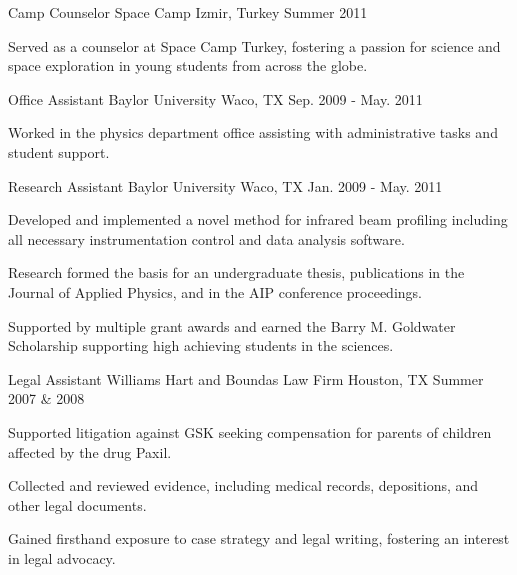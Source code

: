 \begin{cventries}
  \cventry
    {Camp Counselor} %
    {Space Camp} %
    {Izmir, Turkey} %
    {Summer 2011} %
    {
      \begin{cvitems} %
        \item {Served as a counselor at Space Camp Turkey, fostering a passion for science and space exploration in young students from across the globe.}
      \end{cvitems}
    }

  \cventry
    {Office Assistant} %
    {Baylor University} %
    {Waco, TX} %
    {Sep. 2009 - May. 2011} %
    {
      \begin{cvitems} %
        \item {Worked in the physics department office assisting with administrative tasks and student support.}
      \end{cvitems}
    }

  \cventry
    {Research Assistant} %
    {Baylor University} %
    {Waco, TX} %
    {Jan. 2009 - May. 2011} %
    {
      \begin{cvitems} %
        \item {Developed and implemented a novel method for infrared beam profiling including all necessary instrumentation control and data analysis software.}
        \item {Research formed the basis for an undergraduate thesis, publications in the Journal of Applied Physics, and in the AIP conference proceedings.}
        \item {Supported by multiple grant awards and earned the Barry M. Goldwater Scholarship supporting high achieving students in the sciences.}
      \end{cvitems}
    }

  \cventry
    {Legal Assistant} %
    {Williams Hart and Boundas Law Firm} %
    {Houston, TX} %
    {Summer 2007 \& 2008} %
    {
      \begin{cvitems} %
        \item {Supported litigation against GSK seeking compensation for parents of children affected by the drug Paxil.}
        \item {Collected and reviewed evidence, including medical records, depositions, and other legal documents.}
        \item {Gained firsthand exposure to case strategy and legal writing, fostering an interest in legal advocacy.}
      \end{cvitems}
    }


\end{cventries}
